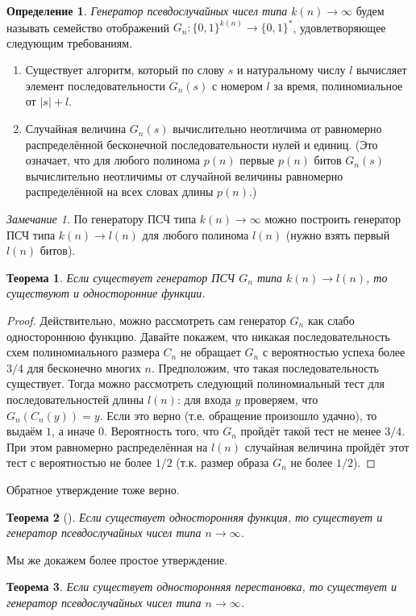 \documentclass[12pt]{article}
\newcommand{\bits}{\{0,1\}}
\newcommand{\bitstr}{\bits^*}
\theoremstyle{definition}
\newtheorem{definition}{Определение}[section]
\theoremstyle{plain}
\newtheorem{theorem}{Теорема}[section]
\theoremstyle{remark}
\newtheorem{remark}{Замечание}[section]
\begin{document}
\begin{definition}
\emph{Генератор псевдослучайных чисел типа $k(n)\to\infty$} будем
называть семейство отображений $G_n: \bits^{k(n)}\to\bitstr$,
удовлетворяющее следующим требованиям.
\begin{enumerate}
\item Существует алгоритм, который по слову $s$ и натуральному числу $l$
вычисляет элемент последовательности $G_n(s)$ с номером $l$ за время, полиномиальное
от $|s| + l$.

\item Случайная величина $G_n(s)$ вычислительно неотличима от равномерно
распределённой бесконечной последовательности нулей и единиц.
(Это означает, что для любого полинома $p(n)$ первые $p(n)$ битов
$G_n(s)$ вычислительно неотличимы от случайной величины равномерно
распределённой на всех словах длины $p(n)$.)
\end{enumerate}
\end{definition}
 
\begin{remark}
По генератору ПСЧ типа $k(n)\to\infty$ можно построить генератор ПСЧ
типа $k(n)\to l(n)$ для любого полинома $l(n)$ (нужно взять первый $l(n)$ битов).
\end{remark}

\begin{theorem}
Если существует генератор ПСЧ $G_n$ типа $k(n)\to l(n)$,
то существуют и односторонние функции.
\end{theorem}
\begin{proof}
Действительно, можно рассмотреть сам генератор $G_n$ как слабо одностороннюю функцию.
Давайте покажем, что никакая последовательность схем полиномиального размера 
$C_n$ не обращает $G_n$ с вероятностью успеха более $3/4$ для бесконечно многих $n$.
Предположим, что такая последовательность существует. Тогда можно рассмотреть
следующий полиномиальный тест для последовательностей длины $l(n)$: для входа $y$ проверяем, что $G_n(C_n(y)) = y$. Если это верно (т.е. обращение произошло удачно), 
то выдаём $1$, а иначе $0$. Вероятность того, что $G_n$ пройдёт такой тест 
не менее $3/4$. При этом равномерно распределённая на $l(n)$ случайная 
величина пройдёт этот тест с вероятностью не более $1/2$ (т.к. размер 
образа $G_n$ не более $1/2$). 
\end{proof}
Обратное утверждение тоже верно. 
\begin{theorem}[\cite{hill}]
Если существует односторонняя функция, то существует
и генератор псевдослучайных чисел типа $n\to\infty$.
\end{theorem}
Мы же докажем более простое утверждение.
\begin{theorem}
Если существует односторонняя перестановка, то существует
и генератор псевдослучайных чисел типа $n\to\infty$.
\end{theorem}
\end{document}
